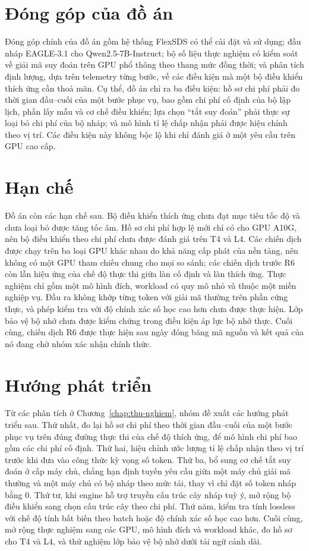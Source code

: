 \section*{Đóng góp của đồ án}

Đóng góp chính của đồ án gồm hệ thống FlexSDS có thể cài đặt và sử dụng; đầu nháp EAGLE-3.1 cho Qwen2.5-7B-Instruct; bộ số liệu thực nghiệm có kiểm soát về giải mã suy đoán trên GPU phổ thông theo thang mức đồng thời; và phân tích định lượng, dựa trên telemetry từng bước, về các điều kiện mà một bộ điều khiển thích ứng cần thoả mãn. Cụ thể, đồ án chỉ ra ba điều kiện: hồ sơ chi phí phải đo thời gian đầu--cuối của một bước phục vụ, bao gồm chi phí cố định của bộ lập lịch, phần lấy mẫu và cơ chế điều khiển; lựa chọn ``tắt suy đoán'' phải thực sự loại bỏ chi phí của bộ nháp; và mô hình tỉ lệ chấp nhận phải được hiệu chỉnh theo vị trí. Các điều kiện này không bộc lộ khi chỉ đánh giá ở một yêu cầu trên GPU cao cấp.

\section*{Hạn chế}

Đồ án còn các hạn chế sau. Bộ điều khiển thích ứng chưa đạt mục tiêu tốc độ và chưa loại bỏ được tăng tốc âm. Hồ sơ chi phí hợp lệ mới chỉ có cho GPU A10G, nên bộ điều khiển theo chi phí chưa được đánh giá trên T4 và L4. Các chiến dịch được chạy trên ba loại GPU khác nhau do khả năng cấp phát của nền tảng, nên không có một GPU tham chiếu chung cho mọi so sánh; các chiến dịch trước R6 còn lẫn hiệu ứng của chế độ thực thi giữa làn cố định và làn thích ứng. Thực nghiệm chỉ gồm một mô hình đích, workload có quy mô nhỏ và thuộc một miền nghiệp vụ. Đầu ra không khớp từng token với giải mã thường trên phần cứng thực, và phép kiểm tra với độ chính xác số học cao hơn chưa được thực hiện. Lớp bảo vệ bộ nhớ chưa được kiểm chứng trong điều kiện áp lực bộ nhớ thực. Cuối cùng, chiến dịch R6 được thực hiện sau ngày đóng băng mã nguồn và kết quả của nó đang chờ nhóm xác nhận chính thức.

\section*{Hướng phát triển}

Từ các phân tích ở Chương~\ref{chap:thu-nghiem}, nhóm đề xuất các hướng phát triển sau. Thứ nhất, đo lại hồ sơ chi phí theo thời gian đầu--cuối của một bước phục vụ trên đúng đường thực thi của chế độ thích ứng, để mô hình chi phí bao gồm các chi phí cố định. Thứ hai, hiệu chỉnh ước lượng tỉ lệ chấp nhận theo vị trí trước khi đưa vào công thức kỳ vọng số token. Thứ ba, bổ sung cơ chế tắt suy đoán ở cấp máy chủ, chẳng hạn định tuyến yêu cầu giữa một máy chủ giải mã thường và một máy chủ có bộ nháp theo mức tải, thay vì chỉ đặt số token nháp bằng 0. Thứ tư, khi engine hỗ trợ truyền cấu trúc cây nháp tuỳ ý, mở rộng bộ điều khiển sang chọn cấu trúc cây theo chi phí. Thứ năm, kiểm tra tính lossless với chế độ tính bất biến theo batch hoặc độ chính xác số học cao hơn. Cuối cùng, mở rộng thực nghiệm sang các GPU, mô hình đích và workload khác, đo hồ sơ cho T4 và L4, và thử nghiệm lớp bảo vệ bộ nhớ dưới tải ngữ cảnh dài.
